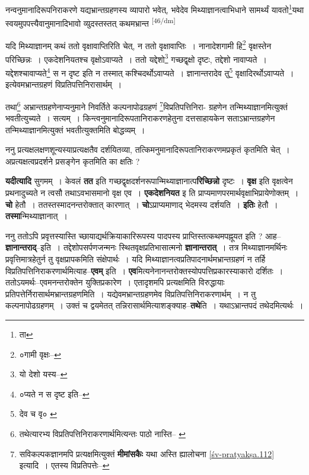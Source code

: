 \documentclass[article,12pt,a4paper]{memoir}
\begin{document}
	  \pstart नन्वनुमानादिरूपनिराकरणे यद्यभ्रान्तग्रहणस्य व्यापारो भवेत्, भवेदेव मिथ्याज्ञानत्वाभिधाने सामर्थ्यं यावतो\footnote{ता}यथा स्वयमुपपत्त्यैवानुमानादिभावो व्युदस्तस्तत् कथमभ्रान्त \leavevmode\textsuperscript{\rmlatinfont\tiny [46/dm]} 
	  
	यदि मिथ्याज्ञानम् कथं ततो वृक्षावाप्तिरिति चेत्, न ततो वृक्षावाप्तिः । नानादेशगामी हि\footnote{०गामी वृक्षः--\cite{dp-msC}} वृक्षस्तेन परिच्छिन्नः । एकदेशनियतश्च वृक्षोऽवाप्यते । ततो यद्देशो\footnote{यो देशो यस्य--\cite{dp-msD-n}} गच्छद्वृक्षो दृष्टः, तद्देशो नावाप्यते । यद्देशश्चावाप्यते\footnote{०प्यते न स दृष्ट इति--\cite{dp-msC}} स न दृष्ट इति न तस्मात् कश्चिदर्थोऽवाप्यते । ज्ञानान्तरादेव तु\footnote{देव च वृ० \cite{dp-msB} \cite{dp-msD}} वृक्षादिरर्थोऽवाप्यते । इत्येवमभ्रान्तग्रहणं विप्रतिपत्तिनिरासार्थम् । 
	  
	तथा\footnote{तथेत्यारभ्य विप्रतिपत्तिनिराकरणार्थमित्यन्तः पाठो नास्ति--\cite{dp-msA} \cite{dp-edP} \cite{dp-edE} \cite{dp-edH}} अभ्रान्तग्रहणेनाप्यनुमाने निवर्तिते कल्पनापोढग्रहणं \footnote{सविकल्पकज्ञानमपि प्रत्यक्षमित्युक्तं \textbf{मीमांसकैः} यथा अस्ति ह्यालोचना \cref{śv-pratyakṣa.112} इत्यादि । एतस्य विप्रतिपत्तेः--\cite{dp-msD-n}}विप्रतिपत्तिनिरा- ग्रहणेन तन्मिथ्याज्ञानमित्युक्तं भवतीत्युच्यते । सत्यम् । किन्त्वनुमानादिरूपतानिराकरणहेतुना दत्तसाहायकेन सताऽभ्रान्तग्रहणेन तन्मिथ्याज्ञानमित्युक्तं भवतीत्युक्तमिति बोद्धव्यम् ।
	\pend
      

	  \pstart ननु प्रत्यक्षलक्षणशून्यस्याप्रत्यक्षतैव दर्शयितव्या, तत्किमनुमानादिरूपतानिराकरणमप्रकृतं कृतमिति चेत् । अप्रत्यक्षत्वप्रदर्शने प्रसङ्गेन कृतमिति का क्षतिः ?
	\pend
      

	  \pstart \textbf{यदीत्यादि} सुगमम् । केवलं \textbf{तत} इति गच्छद्वृक्षदर्शनरूपान्मिथ्याज्ञानात्प\textbf{रिच्छिन्नो} दृष्टः । \textbf{वृक्ष} इति वृक्षत्वेन प्रथनादुच्यते न त्वसौ तथाऽवभासमानो वृक्ष एव । \textbf{एकदेशनियत} इ ति प्राप्यमाणपरमार्थवृक्षाभिप्रायेणोक्तम् । \textbf{चो} हेतौ । ततस्तस्मादनन्तरोक्तात् कारणात् । \textbf{चो}ऽप्राप्यमाणाद् भेदमस्य दर्शयति । \textbf{इतिः} हेतौ । \textbf{तस्मा}न्मिथ्याज्ञानात् ।
	\pend
      

	  \pstart ननु ततोऽपि प्रवृत्तस्यास्ति च्छायाद्यर्थक्रियाकारिरूपस्य पादपस्य प्राप्तिस्तत्कथमपह्नूयत इति ? आह--\textbf{ज्ञानान्तराद्}--इति । तद्देशोपसर्पणजन्मनः स्थितवृक्षप्रतिभासात्मनो \textbf{ज्ञानान्तरात्} । तत्र मिथ्याज्ञानमर्थिनः प्रवृत्तिमात्रहेतुर्न तु वृक्षप्रापकमिति संक्षेपार्थः । यदि मिथ्याज्ञानत्वप्रतिपादनार्थमभ्रान्तग्रहणं न तर्हि विप्रतिपत्तिनिराकरणार्थमित्याह--\textbf{एवम्} इति । \textbf{एव}मित्यनेनानन्तरोक्तस्योपपत्तिप्रकारस्याकारो दर्शितः । ततोऽयमर्थः--एवमनन्तरोक्तेन युक्तिप्रकारेण । एतादृशमपि प्रत्यक्षमिति विरुद्धायाः प्रतिपत्तेर्निरासार्थमभ्रान्तग्रहणमिति । यद्येवमभ्रान्तग्रहणमेव विप्रतिपत्तिनिराकरणार्थम् । न तु कल्पनापोढग्रहणम् । उक्तं च द्वयमेतत् तन्निरासार्थमित्याशङ्क्याह--\textbf{तथे}ति । यथाऽभ्रान्तपदं तथेदमित्यर्थः ।
	\pend
      
\end{document}
